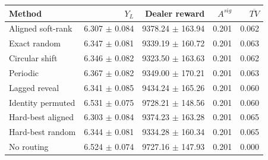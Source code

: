 \begin{tabular}{lrrrr}
\toprule
Method & $Y_L$ & Dealer reward & $A^{sig}$ & $\overline{TV}$ \\ 
\midrule
Aligned soft-rank & 6.307 $\pm$ 0.084 & 9378.24 $\pm$ 163.94 & 0.201 & 0.062 \\
Exact random & 6.347 $\pm$ 0.081 & 9339.19 $\pm$ 160.72 & 0.201 & 0.063 \\
Circular shift & 6.346 $\pm$ 0.082 & 9323.50 $\pm$ 163.63 & 0.201 & 0.062 \\
Periodic & 6.367 $\pm$ 0.082 & 9349.00 $\pm$ 170.21 & 0.201 & 0.063 \\
Lagged reveal & 6.341 $\pm$ 0.085 & 9434.24 $\pm$ 165.26 & 0.201 & 0.060 \\
Identity permuted & 6.531 $\pm$ 0.075 & 9728.21 $\pm$ 148.56 & 0.201 & 0.060 \\
Hard-best aligned & 6.303 $\pm$ 0.084 & 9374.23 $\pm$ 163.28 & 0.201 & 0.065 \\
Hard-best random & 6.344 $\pm$ 0.081 & 9334.28 $\pm$ 160.34 & 0.201 & 0.065 \\
No routing & 6.524 $\pm$ 0.074 & 9727.16 $\pm$ 147.93 & 0.201 & 0.000 \\
\bottomrule
\end{tabular}

